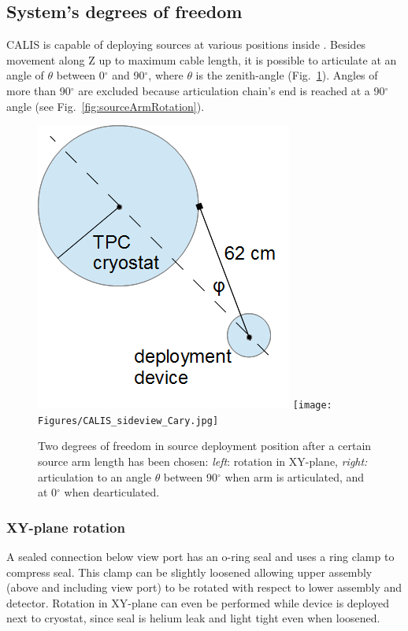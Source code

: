 \subsection{System's degrees of freedom}

CALIS is capable of deploying sources at various positions inside \lsv. Besides movement along Z up to maximum cable length, it is possible to articulate at an angle of $\theta$ between 0$^{\circ}$ and 90$^{\circ}$, where $\theta$ is the zenith-angle (Fig.~\ref{fig:coordinate_system}). Angles of more than 90$^{\circ}$ are excluded because articulation chain's end is reached at a 90$^{\circ}$ angle (see Fig.~\ref{fig:sourceArmRotation}).

\begin{figure}[htbp]
 \centering
  \includegraphics[height=0.37\textheight]{Figures/DeploymentDevice_XY_view}
  \texttt{[image: Figures/CALIS\_sideview\_Cary.jpg]}
  \caption{Two degrees of freedom in source deployment position after a certain source arm length has been chosen: \textit{left}: rotation in XY-plane, \textit{right:} articulation to an angle $\theta$ between 90$^{\circ}$ when arm is articulated, and at 0$^{\circ}$ when dearticulated. }
  \label{fig:coordinate_system}
\end{figure} 

\subsubsection{XY-plane rotation}\label{sec:XYrotation}
A sealed connection below view port has an o-ring seal and uses a ring clamp to compress seal. This clamp can be slightly loosened allowing upper assembly (above and including view port) to be rotated with respect to lower assembly and detector. Rotation in XY-plane can even be performed while device is deployed next to cryostat, since seal is helium leak and light tight even when loosened.

